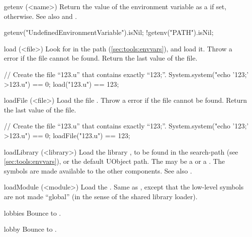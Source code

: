 \begin{urbiscriptapi}
\item[getenv](<name>)%
  Return the value of the environment variable  as a
   if set,  otherwise.  See also
   and .
\begin{urbiassert}
getenv("UndefinedEnvironmentVariable").isNil;
!getenv("PATH").isNil;
\end{urbiassert}




\item[load](<file>)%
  Look for  in the \urbi path (\autoref{sec:tools:envvars}), and
  load it.  Throw a  error if the file
  cannot be found.  Return the last value of the file.
\begin{urbiassert}
// Create the file ``123.u'' that contains exactly ``123;''.
System.system("echo '123;' >123.u") == 0;
load("123.u") == 123;
\end{urbiassert}


\item[loadFile](<file>)%
  Load the \us file .  Throw a 
  error if the file cannot be found.  Return the last value of the file.
\begin{urbiassert}
// Create the file ``123.u'' that contains exactly ``123;''.
System.system("echo '123;' >123.u") == 0;
loadFile("123.u") == 123;
\end{urbiassert}


\item[loadLibrary](<library>)%
  Load the library , to be found in the
   search-path (see
  \autoref{sec:tools:envvars}), or the default UObject path.
  The  may be a  or a .
  The \Cxx symbols are made available to the other \Cxx components.  See also
  .


\item[loadModule](<module>)%
  Load the \UObject {}.  Same as , except
  that the low-level \Cxx symbols are not made ``global'' (in the sense of
  the shared library loader).


\item[lobbies] Bounce to .


\item[lobby] Bounce to .



\end{urbiscriptapi}
